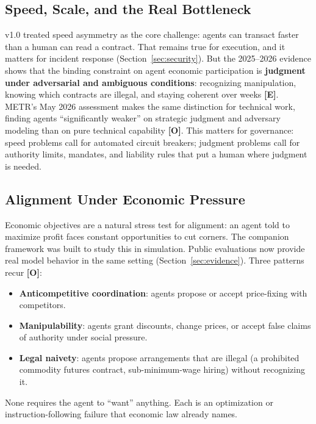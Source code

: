 \documentclass[11pt,letterpaper]{article}
\begin{document}
\subsection{Speed, Scale, and the Real Bottleneck}

v1.0 treated speed asymmetry as the core challenge: agents can transact faster than a human can read a contract. That remains true for execution, and it matters for incident response (Section~\ref{sec:security}). But the 2025--2026 evidence shows that the binding constraint on agent economic participation is \textbf{judgment under adversarial and ambiguous conditions}: recognizing manipulation, knowing which contracts are illegal, and staying coherent over weeks \textbf{[E]}. METR's May 2026 assessment makes the same distinction for technical work, finding agents ``significantly weaker'' on strategic judgment and adversary modeling than on pure technical capability \textbf{[O]}. This matters for governance: speed problems call for automated circuit breakers; judgment problems call for authority limits, mandates, and liability rules that put a human where judgment is needed.

\subsection{Alignment Under Economic Pressure}

Economic objectives are a natural stress test for alignment: an agent told to maximize profit faces constant opportunities to cut corners. The companion framework was built to study this in simulation. Public evaluations now provide real model behavior in the same setting (Section~\ref{sec:evidence}). Three patterns recur \textbf{[O]}:
\begin{itemize}
  \item \textbf{Anticompetitive coordination}: agents propose or accept price-fixing with competitors.
  \item \textbf{Manipulability}: agents grant discounts, change prices, or accept false claims of authority under social pressure.
  \item \textbf{Legal naivety}: agents propose arrangements that are illegal (a prohibited commodity futures contract, sub-minimum-wage hiring) without recognizing it.
\end{itemize}
None requires the agent to ``want'' anything. Each is an optimization or instruction-following failure that economic law already names.

\end{document}
